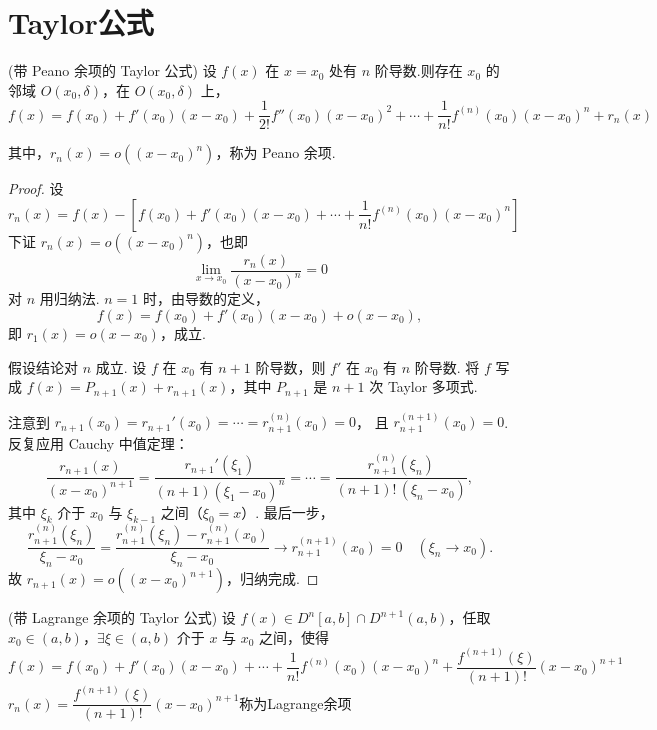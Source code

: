 \section{Taylor公式}
\begin{theorem}(带 Peano 余项的 Taylor 公式)
	设 $f(x)$ 在 $x = x_0$ 处有 $n$ 阶导数.则存在 $x_0$ 的邻域 $O(x_0, \delta)$，在 $O(x_0, \delta)$ 上，
	\[
	f(x) = f(x_0) + f'(x_0)(x-x_0) + \frac{1}{2!} f''(x_0)(x-x_0)^2 + \cdots + \frac{1}{n!} f^{(n)}(x_0)(x-x_0)^n + r_n(x)
	\]
	
	其中，$r_n(x) = o((x-x_0)^n)$，称为 Peano 余项.
	
	
\end{theorem}
\begin{proof}
	设
	\[
	r_n(x) = f(x) - \left[f(x_0) + f'(x_0)(x-x_0) + \cdots + \frac{1}{n!} f^{(n)}(x_0)(x-x_0)^n\right]
	\]
	下证 $r_n(x) = o((x-x_0)^n)$，也即
	\[
	\lim_{x \to x_0} \frac{r_n(x)}{(x-x_0)^n} = 0
	\]
	对 $n$ 用归纳法. $n=1$ 时，由导数的定义，
	\[
	f(x) = f(x_0) + f'(x_0)(x-x_0) + o(x-x_0),
	\]
	即 $r_1(x) = o(x-x_0)$，成立.
	
	假设结论对 $n$ 成立. 设 $f$ 在 $x_0$ 有 $n+1$ 阶导数，则 $f'$ 在 $x_0$ 有 $n$ 阶导数.
	将 $f$ 写成 $f(x)=P_{n+1}(x)+r_{n+1}(x)$，其中 $P_{n+1}$ 是 $n+1$ 次 Taylor 多项式.
	
	注意到 $r_{n+1}(x_0) = r_{n+1}'(x_0) = \cdots = r_{n+1}^{(n)}(x_0) = 0$，
	且 $r_{n+1}^{(n+1)}(x_0) = 0$. 反复应用 Cauchy 中值定理：
	\[
	\frac{r_{n+1}(x)}{(x-x_0)^{n+1}}
	= \frac{r_{n+1}'(\xi_1)}{(n+1)(\xi_1-x_0)^n}
	= \cdots
	= \frac{r_{n+1}^{(n)}(\xi_n)}{(n+1)!\,(\xi_n-x_0)},
	\]
	其中 $\xi_k$ 介于 $x_0$ 与 $\xi_{k-1}$ 之间（$\xi_0 = x$）.
	最后一步，
	\[
	\frac{r_{n+1}^{(n)}(\xi_n)}{\xi_n-x_0}
	= \frac{r_{n+1}^{(n)}(\xi_n) - r_{n+1}^{(n)}(x_0)}{\xi_n-x_0}
	\to r_{n+1}^{(n+1)}(x_0) = 0 \quad (\xi_n\to x_0).
	\]
	故 $r_{n+1}(x) = o((x-x_0)^{n+1})$，归纳完成.
\end{proof}
\begin{theorem}(带 Lagrange 余项的 Taylor 公式)
	设 $f(x) \in D^n[a, b]\cap D^{n+1}(a, b)$，任取 $ x_0 \in (a,b)$，$\exists \xi \in (a, b)$ 介于 $x$ 与 $x_0$ 之间，使得
	\[
	f(x) = f(x_0) + f'(x_0)(x-x_0) + \cdots + \frac{1}{n!} f^{(n)}(x_0)(x-x_0)^n + \frac{f^{(n+1)}(\xi)}{(n+1)!}(x-x_0)^{n+1}
	\]
	$r_n(x)=\dfrac{f^{(n+1)}(\xi)}{(n+1)!}(x-x_0)^{n+1}$称为Lagrange余项
\end{theorem}
